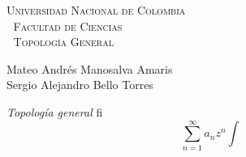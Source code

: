 \documentclass[12bpt]{article}
\begin{document}
\setlength{\parindent}{0cm}
\hoffset-0.46cm
\voffset-1.46cm
\begin{window}
\large\scshape \hspace{1.2cm}\textsf{Universidad Nacional de Colombia} \\
\textcolor{white}{\tiny.}  \large \hspace{2.5cm} \textsf{Facultad de Ciencias} \\
\textcolor{white}{\tiny.}   \normalsize\hspace{3.15cm}\textsf{Topología General}\\
\end{window}
\vspace{0.8cm}
\small
\textsf{Mateo Andrés Manosalva Amaris\\
Sergio Alejandro Bello Torres} 
\normalsize
\dotfill
\vspace{0.7cm}

\textit{Topología general}
fi
$$\sum_{n=1}^{\infty} a_n z^n\int$$
\end{document}
